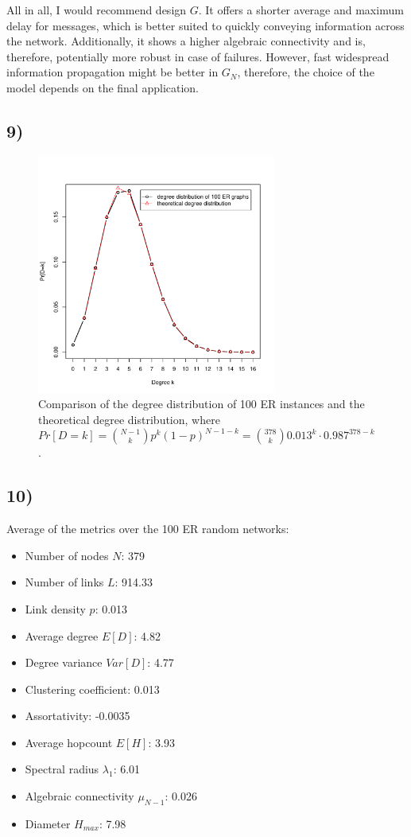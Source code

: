 \documentclass{article}
\begin{document}
\vspace*{0.5em}
\noindent All in all, I would recommend design $G$. It offers a
shorter average and maximum delay for messages, which is better suited
to quickly conveying information across the network.  Additionally, it
shows a higher algebraic connectivity and is, therefore, potentially
more robust in case of failures. However, fast widespread information
propagation might be better in $G_N$, therefore, the choice of the
model depends on the final application.

\subsection*{9)}

\begin{figure}[H]
  \centering
  \includegraphics[width=0.7\textwidth]{er_degree_distribution}
  \caption{Comparison of the degree distribution of 100 ER instances
    and the theoretical degree distribution, where $Pr[D=k] =
    \binom{N-1}{k}p^k(1-p)^{N-1-k}=\binom{378}{k}0.013^k\cdot0.987^{378-k}$.}
\end{figure}


\subsection*{10)}
Average of the metrics over the 100 ER random networks:
\begin{itemize}
 \item Number of nodes $N$: 379
 \item Number of links $L$: 914.33
 \item Link density $p$: 0.013
 \item Average degree $E[D]$: 4.82
 \item Degree variance $Var[D]$: 4.77
 \item Clustering coefficient: 0.013
 \item Assortativity: -0.0035
 \item Average hopcount $E[H]$: 3.93
 \item Spectral radius $\lambda_1$: 6.01
 \item Algebraic connectivity $\mu_{N-1}$: 0.026
 \item Diameter $H_{max}$: 7.98
\end{itemize}
\end{document}
